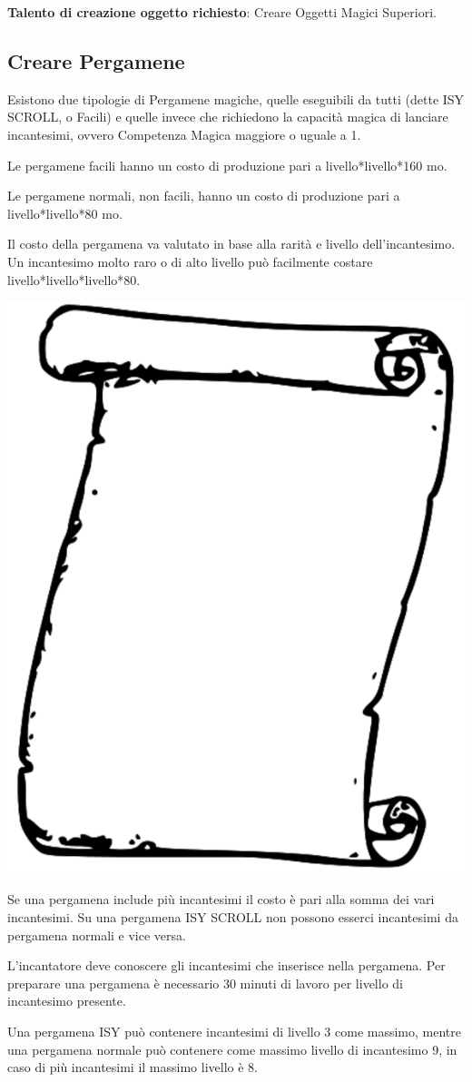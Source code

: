 \begin{multicols}{2}
\textbf{Talento di creazione oggetto richiesto}: Creare Oggetti Magici Superiori.

\subsection{Creare Pergamene}
\medskip

Esistono due tipologie di Pergamene magiche, quelle eseguibili da tutti (dette ISY SCROLL, o Facili) e quelle invece che richiedono la capacità magica di lanciare incantesimi, ovvero Competenza Magica maggiore o uguale a 1.

Le pergamene facili hanno un costo di produzione pari a livello*livello*160 mo.

Le pergamene normali, non facili, hanno un costo di produzione pari a livello*livello*80 mo.

Il costo della pergamena va valutato in base alla rarità e livello dell'incantesimo. Un incantesimo molto raro o di alto livello può facilmente costare livello*livello*livello*80.

\begin{center}
\includegraphics[width=0.4\linewidth]{immagini/scroll3.png}
\end{center}

Se una pergamena include più incantesimi il costo è pari alla somma dei vari incantesimi. Su una pergamena ISY SCROLL non possono esserci incantesimi da pergamena normali e vice versa.

L'incantatore deve conoscere gli incantesimi che inserisce nella pergamena. Per preparare una pergamena è necessario 30 minuti di lavoro per livello di incantesimo presente.

Una pergamena ISY può contenere incantesimi di livello 3 come massimo, mentre una pergamena normale può contenere come massimo livello di incantesimo 9, in caso di più incantesimi il massimo livello è 8.


\end{multicols}

